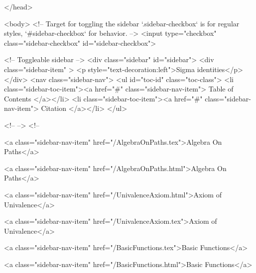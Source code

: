   
</head>




  <body>
    <!-- Target for toggling the sidebar `.sidebar-checkbox` is for regular
     styles, `#sidebar-checkbox` for behavior. -->
<input type="checkbox" class="sidebar-checkbox" id="sidebar-checkbox">

<!-- Toggleable sidebar -->
<div class="sidebar" id="sidebar">
  <div class="sidebar-item" >
    <p style="text-decoration:left">Sigma identities</p>
  </div>
  <nav class="sidebar-nav">
    <ul id="toc-id" class="toc-class">
  <li class="sidebar-toc-item"><a href="#" class="sidebar-nav-item"> Table of Contents </a></li>
  <li class="sidebar-toc-item"><a href="#" class="sidebar-nav-item"> Citation </a></li>
</ul>


    <!--  -->
    <!-- 
      
    
      
    
      
    
      
        
      
    
      
        
          <a class="sidebar-nav-item" href="/AlgebraOnPaths.tex">Algebra On Paths</a>
        
      
    
      
        
          <a class="sidebar-nav-item" href="/AlgebraOnPaths.html">Algebra On Paths</a>
        
      
    
      
        
          <a class="sidebar-nav-item" href="/UnivalenceAxiom.html">Axiom of Univalence</a>
        
      
    
      
        
          <a class="sidebar-nav-item" href="/UnivalenceAxiom.tex">Axiom of Univalence</a>
        
      
    
      
        
          <a class="sidebar-nav-item" href="/BasicFunctions.tex">Basic Functions</a>
        
      
    
      
        
          <a class="sidebar-nav-item" href="/BasicFunctions.html">Basic Functions</a>
        
      
    
      
        
